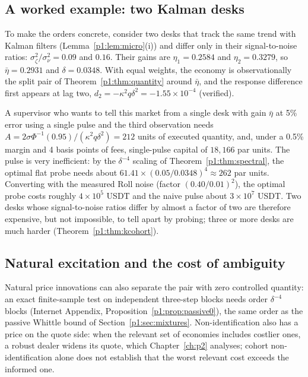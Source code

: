 \subsection{A worked example: two Kalman desks}\label{p1:sec:worked}

To make the orders concrete, consider two desks that track the same trend with Kalman filters (Lemma~\ref{p1:lem:micro}(i)) and differ only in their signal-to-noise ratios: $\sigma_\zeta^2/\sigma_\nu^2=0.09$ and $0.16$. Their gains are $\eta_1=0.2584$ and $\eta_2=0.3279$, so $\bar\eta=0.2931$ and $\delta=0.0348$. With equal weights, the economy is observationally the split pair of Theorem~\ref{p1:thm:quantity} around $\bar\eta$, and the response difference first appears at lag two, $d_2=-\kappa^2q\delta^2=-1.55\times10^{-4}$ (verified).

A supervisor who wants to tell this market from a single desk with gain $\bar\eta$ at 5\% error using a single pulse and the third observation needs $A=2\sigma\Phi^{-1}(0.95)/(\kappa^2q\delta^2)=212$ units of executed quantity, and, under a 0.5\% margin and 4 basis points of fees, single-pulse capital of $18{,}166$ par units. The pulse is very inefficient: by the $\delta^{-4}$ scaling of Theorem~\ref{p1:thm:spectral}, the optimal flat probe needs about $61.41\times(0.05/0.0348)^4\approx262$ par units. Converting with the measured Roll noise (factor $(0.40/0.01)^2$), the optimal probe costs roughly $4\times10^5$ USDT and the naive pulse about $3\times10^7$ USDT. Two desks whose signal-to-noise ratios differ by almost a factor of two are therefore expensive, but not impossible, to tell apart by probing; three or more desks are much harder (Theorem~\ref{p1:thm:kcohort}).

\subsection{Natural excitation and the cost of ambiguity}

Natural price innovations can also separate the pair with zero controlled quantity: an exact finite-sample test on independent three-step blocks needs order $\delta^{-4}$ blocks (Internet Appendix, Proposition~\ref{p1:prop:passive0}), the same order as the passive Whittle bound of Section~\ref{p1:sec:mixtures}. Non-identification also has a price on the quote side: when the relevant set of economies includes costlier ones, a robust dealer widens its quote, which Chapter~\ref{ch:p2} analyses; cohort non-identification alone does not establish that the worst relevant cost exceeds the informed one.
